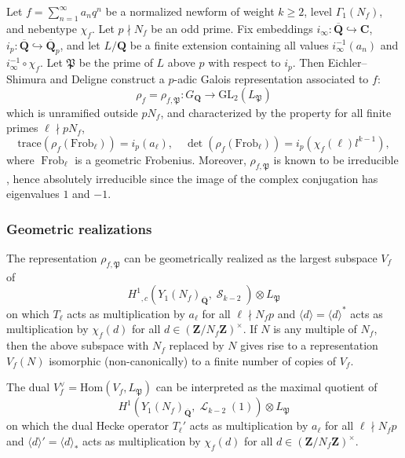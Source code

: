 \documentclass[10pt,letterpaper]{amsart}
\theoremstyle{plain}
\theoremstyle{definition}
\theoremstyle{definition}
\theoremstyle{plain}
\theoremstyle{plain}
\theoremstyle{plain}
\theoremstyle{remark}
\numberwithin{equation}{section}
\DeclareMathOperator{\et}{\acute{e}t}
\DeclareMathOperator{\Ll}{\mathscr{L}}
\DeclareMathOperator{\Ss}{\mathscr{S}}
\DeclareMathOperator{\Frob}{\mathrm{Frob}}
\newcommand{\bC}{\mathbf{C}}
\newcommand{\Q}{\mathbf{Q}}
\newcommand{\Z}{\mathbf{Z}}
\begin{document}
Let $f=\sum_{n=1}^\infty a_n q^n$ be a normalized newform of weight $k\ge 2$, level $\Gamma_1(N_f)$, and nebentype $\chi_f$. Let $p\nmid N_f$ be an odd prime. Fix embeddings $i_\infty: \overline{\Q}\hookrightarrow \bC$, $i_p: \overline{\Q}\hookrightarrow \overline{\Q}_p$, and let $L/\Q$ be a finite extension containing all values $i_\infty^{-1}(a_n)$ and $i_\infty^{-1}\circ \chi_f$. 
Let $\mathfrak{P}$ be the prime of $L$ above $p$ with respect to $i_p$. %
Then Eichler--Shimura %
and Deligne %
construct a $p$-adic Galois representation associated to $f$:
\begin{equation}\label{ES}
    \rho_f=\rho_{f,\mathfrak{P}}:G_{\Q}\rightarrow {\mathrm{GL}}_2(L_{\mathfrak{P}})\nonumber
\end{equation}
which is unramified outside $pN_f$, and characterized by the property for all finite primes $\ell\nmid pN_f$, 
\[
\mathrm{trace}(\rho_{f}(\mathrm{Frob}_\ell))=i_p(a_\ell),\quad
\det(\rho_{f}(\mathrm{Frob}_\ell))=i_p(\chi_f(\ell)l^{k-1}),
\]
where $\Frob_\ell$ is a geometric Frobenius. Moreover, $\rho_{f,\mathfrak{P}}$ is known to be irreducible \cite{Ri}, hence absolutely irreducible since the image of the complex conjugation has eigenvalues $1$ and $-1$. 



\subsubsection{Geometric realizations} The representation $\rho_{f,\mathfrak{P}}$ can be geometrically realized as the largest subspace $V_f$ of
\[
H^1_{\et,c}(Y_1(N_f)_{\overline{\Q}},\Ss_{k-2})\otimes L_{\mathfrak{P}}
\]
on which $T_\ell$ acts as multiplication by $a_\ell$ for all $\ell\nmid N_fp$ and $\langle d\rangle= \langle d\rangle^*$ acts as multiplication by $\chi_f(d)$ for all $d\in (\Z/N_f\Z)^\times$. If $N$ is any multiple of $N_f$, then the above subspace with $N_f$ replaced by $N$ gives rise to a representation $V_f(N)$ isomorphic (non-canonically) to a finite number of copies of $V_f$.

The dual $V_f^{\vee}={\mathrm{Hom}}(V_f,L_{\mathfrak{P}})$ 
 can be interpreted as the maximal quotient of 
\[
H^1_{\et}(Y_1(N_f)_{\overline{\Q}},\Ll_{k-2}(1))\otimes L_{\mathfrak{P}}
\]
on which the dual Hecke operator $T_\ell'$ acts as multiplication by $a_\ell$ for all $\ell\nmid N_fp$ and $\langle d\rangle'= \langle d\rangle_{*}$ acts as multiplication by $\chi_f(d)$ for all $d\in (\Z/N_f\Z)^\times$. 
\end{document}
